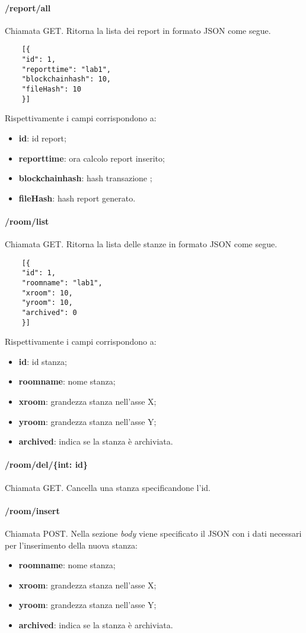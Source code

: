 \paragraph{/report/all}
Chiamata GET. Ritorna la lista dei report in formato JSON come segue.	\\
\begin{center}
	\begin{lstlisting}
	[{
	"id": 1,
	"reporttime": "lab1",
	"blockchainhash": 10,
	"fileHash": 10
	}]
	\end{lstlisting}
\end{center}
Rispettivamente i campi corrispondono a:
\begin{itemize}
	\item \textbf{id}: id report;
	\item \textbf{reporttime}: ora calcolo report inserito;
	\item \textbf{blockchainhash}: hash transazione ;
	\item \textbf{fileHash}: hash report generato.
\end{itemize}
\paragraph{/room/list}
Chiamata GET. Ritorna la lista delle stanze in formato JSON come segue.	\\
\begin{center}
	\begin{lstlisting}
	[{
	"id": 1,
	"roomname": "lab1",
	"xroom": 10,
	"yroom": 10,
	"archived": 0
	}]
	\end{lstlisting}
\end{center}
Rispettivamente i campi corrispondono a:
\begin{itemize}
	\item \textbf{id}: id stanza;
	\item \textbf{roomname}: nome stanza;
	\item \textbf{xroom}: grandezza stanza nell'asse X;
	\item \textbf{yroom}: grandezza stanza nell'asse Y;
	\item \textbf{archived}: indica se la stanza è archiviata.	
\end{itemize}
\paragraph{/room/del/\{int: id\}}
Chiamata GET. Cancella una stanza specificandone l'id.
\paragraph{/room/insert}
Chiamata POST. Nella sezione \textit{body} viene specificato il JSON con i dati necessari per l'inserimento della nuova stanza:
\begin{itemize}
	\item \textbf{roomname}: nome stanza;
	\item \textbf{xroom}: grandezza stanza nell'asse X;
	\item \textbf{yroom}: grandezza stanza nell'asse Y;
	\item \textbf{archived}: indica se la stanza è archiviata.		
\end{itemize}

